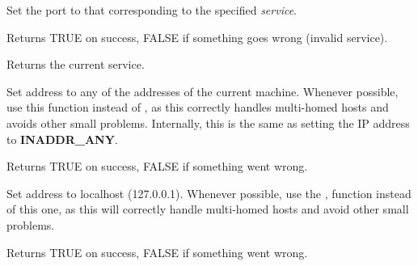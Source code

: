 Set the port to that corresponding to the specified {\it service}.


Returns TRUE on success, FALSE if something goes wrong
(invalid service).

%
%



Returns the current service.

%
%

\label{wxipv4addressanyaddress}


Set address to any of the addresses of the current machine. Whenever
possible, use this function instead of ,
as this correctly handles multi-homed hosts and avoids other small
problems. Internally, this is the same as setting the IP address
to {\bf INADDR\_ANY}.


Returns TRUE on success, FALSE if something went wrong.


%
%

\label{wxipv4addresslocalhost}


Set address to localhost (127.0.0.1). Whenever possible, use the
,
function instead of this one, as this will correctly handle multi-homed
hosts and avoid other small problems.


Returns TRUE on success, FALSE if something went wrong.
